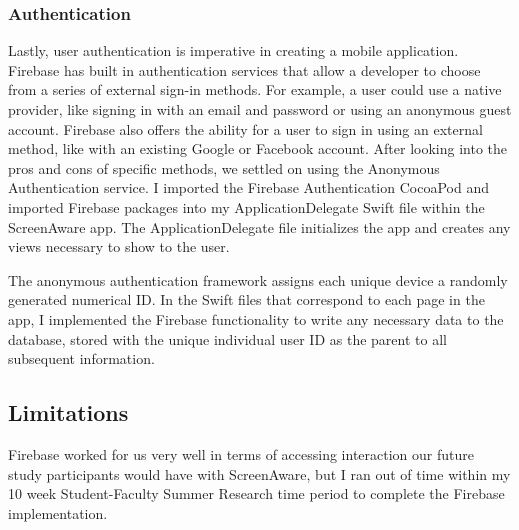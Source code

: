 \documentclass[12pt, title page, manuscript, nonacm]{acmart}
\begin{document}
\subsubsection*{Authentication}
Lastly, user authentication is imperative in creating a mobile application. Firebase has built in authentication services that allow a developer to choose from a series of external sign-in methods. For example, a user could use a native provider, like signing in with an email and password or using an anonymous guest account. Firebase also offers the ability for a user to sign in using an external method, like with an existing Google or Facebook account. After looking into the pros and cons of specific methods, we settled on using the Anonymous Authentication service. I imported the Firebase Authentication CocoaPod and imported Firebase packages into my ApplicationDelegate Swift file within the ScreenAware app. The ApplicationDelegate file initializes the app and creates any views necessary to show to the user.
\par The anonymous authentication framework assigns each unique device a randomly generated numerical ID. In the Swift files that correspond to each page in the app, I implemented the Firebase functionality to write any necessary data to the database, stored with the unique individual user ID as the parent to all subsequent information.
\subsection*{Limitations}
Firebase worked for us very well in terms of accessing interaction our future study participants would have with ScreenAware, but I ran out of time within my 10 week Student-Faculty Summer Research time period to complete the Firebase implementation.

\end{document}
